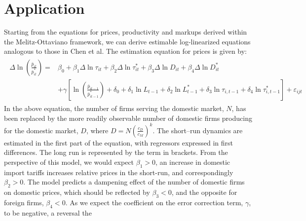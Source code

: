 \section{Application}\label{sec:app}
Starting from the equations for prices, productivity and markups derived within the Melitz-Ottaviano framework, we can derive estimable log-linearized equations analogous to those in Chen et al. The estimation equation for prices is given by:
\begin{align}
\begin{split}\label{eq:gw-estimation-prices}
\Delta \ln \left( \frac{\bar{p}_{it}}{\bar{p}_{it}^*} \right) = &\beta_0 + \beta_1 \Delta \ln \tau_{it} + \beta_2 \Delta \ln \tau_{it}^* + \beta_3 \Delta \ln D_{it} + \beta_4 \Delta \ln D_{it}^* \\ &+ \gamma \left[ \ln \left( \frac{\bar{p}_{it-1}}{\bar{p}_{it-1}^*} \right) + \delta_0 + \delta_1 \ln L_{t-1} + \delta_2\ln L_{t-1}^* + \delta_3 \ln  \tau_{i,t-1} + \delta_4 \ln  \tau_{i,t-1}^* \right] + \varepsilon_{ijt} 
\end{split}\end{align}
In the above equation, the number of firms serving the domestic market, $N$, has been replaced by the more readily observable number of domestic firms producing for the domestic market, $D$, where $D=N \left( \frac{c_D}{c_M} \right)^k$. The short--run dynamics are estimated in the first part of the equation, with regressors expressed in first differences. The long run is represented by the term in brackets. From the perspective of this model, we would expect $\beta_1>0$, an increase in domestic import tariffs increases relative prices in the short-run, and correspondingly $\beta_2>0$. The model predicts a dampening effect of the number of domestic firms on domestic prices, which should be reflected by $\beta_3<0$, and the opposite for foreign firms, $\beta_4<0$. As we expect the coefficient on the error correction term, $\gamma$, to be negative, a reversal the 

